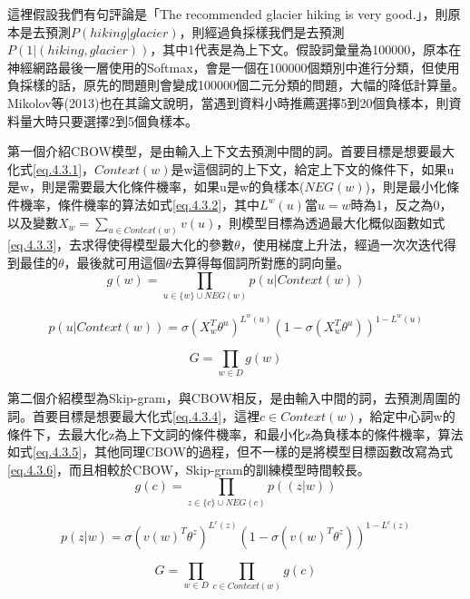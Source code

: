 	這裡假設我們有句評論是「The recommended glacier hiking is very good.」，則原本是去預測$P(hiking|glacier)$，則經過負採樣我們是去預測$P(1|(hiking,glacier))$，其中1代表是為上下文。假設詞彙量為100000，原本在神經網路最後一層使用的Softmax，會是一個在100000個類別中進行分類，但使用負採樣的話，原先的問題則會變成100000個二元分類的問題，大幅的降低計算量。Mikolov等(2013)也在其論文說明，當遇到資料小時推薦選擇5到20個負樣本，則資料量大時只要選擇2到5個負樣本。
	
	第一個介紹CBOW模型，是由輸入上下文去預測中間的詞。首要目標是想要最大化式\ref{eq.4.3.1}，$Context(w)$是w這個詞的上下文，給定上下文的條件下，如果u是w，則是需要最大化條件機率，如果u是w的負樣本($NEG(w)$)，則是最小化條件機率，條件機率的算法如式\ref{eq.4.3.2}，其中$L^w(u)$當$u=w$時為1，反之為0，以及變數$X_w=\sum\limits_{u \in Context(w)}v(u)$，則模型目標為透過最大化概似函數如式\ref{eq.4.3.3}，去求得使得模型最大化的參數$\theta$，使用梯度上升法，經過一次次迭代得到最佳的$\theta$，最後就可用這個$\theta$去算得每個詞所對應的詞向量。
	\begin{equation}\label{eq.4.3.1}
	g(w)=\prod_{u\in {\{w\}\cup NEG(w)}}p\left(u|Context(w)\right)
	\end{equation}

	\begin{equation}\label{eq.4.3.2}
	p\left(u|Context(w)\right)=\sigma(X_w^T\theta^u)^{L^w(u)}(1-\sigma(X_w^T\theta^u))^{1-L^w(u)}
	\end{equation}
	
	\begin{equation}\label{eq.4.3.3}
	G=\prod_{w\in D}g(w)
	\end{equation}

	第二個介紹模型為Skip-gram，與CBOW相反，是由輸入中間的詞，去預測周圍的詞。首要目標是想要最大化式\ref{eq.4.3.4}，這裡$c\in Context(w)$，給定中心詞w的條件下，去最大化z為上下文詞的條件機率，和最小化z為負樣本的條件機率，算法如式\ref{eq.4.3.5}，其他同理CBOW的過程，但不一樣的是將模型目標函數改寫為式\ref{eq.4.3.6}，而且相較於CBOW，Skip-gram的訓練模型時間較長。
	\begin{equation}\label{eq.4.3.4}
	g(c)=\prod_{z\in \{c\} \cup NEG(c)}p\left((z|w)\right)
	\end{equation}
	
	\begin{equation}\label{eq.4.3.5}
	p\left(z|w\right)=\sigma(v(w)^T\theta^z)^{L^c(z)}(1-\sigma(v(w)^T\theta^z))^{1-L^c(z)}
	\end{equation}
	
	\begin{equation}\label{eq.4.3.6}
	G=\prod_{w\in D}\prod_{c\in Context(w)}g(c)
	\end{equation}
	
